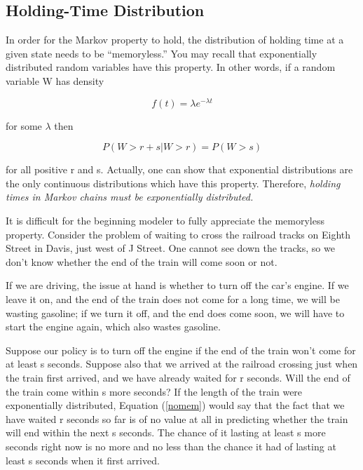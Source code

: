 \documentclass[11pt]{article}
\begin{document}
\subsection{Holding-Time Distribution}

In order for the Markov property to hold, the distribution of holding
time at a given state needs to be ``memoryless.'' You may recall that
exponentially distributed random variables have this property. In other
words, if a random variable W has density

\begin{equation}
f(t)=\lambda e^{-\lambda t}
\end{equation}

for some $\lambda$ then

\begin{equation}
\label{nomem}
P(W>r+s|W>r)=P(W>s)
\end{equation}

for all positive r and s. Actually, one can show that exponential
distributions are the only continuous distributions which have this
property. Therefore, \textsl{holding times in Markov chains must be
exponentially distributed.}  

It is difficult for the beginning modeler to fully appreciate the
memoryless property. Consider the problem of waiting to cross the
railroad tracks on Eighth Street in Davis, just west of J Street. One
cannot see down the tracks, so we don't know whether the end of the
train will come soon or not.

If we are driving, the issue at hand is whether to turn off the car's
engine.  If we leave it on, and the end of the train does not come for a
long time, we will be wasting gasoline; if we turn it off, and the end
does come soon, we will have to start the engine again, which also
wastes gasoline.

Suppose our policy is to turn off the engine if the end of the train
won't come for at least s seconds. Suppose also that we arrived at the
railroad crossing just when the train first arrived, and we have already
waited for r seconds.  Will the end of the train come within s more
seconds? If the length of the train were exponentially distributed,
Equation (\ref{nomem}) would say that the fact that we have waited r
seconds so far is of no value at all in predicting whether the train
will end within the next s seconds. The chance of it lasting at least s
more seconds right now is no more and no less than the chance it had of
lasting at least s seconds when it first arrived.
\end{document}
